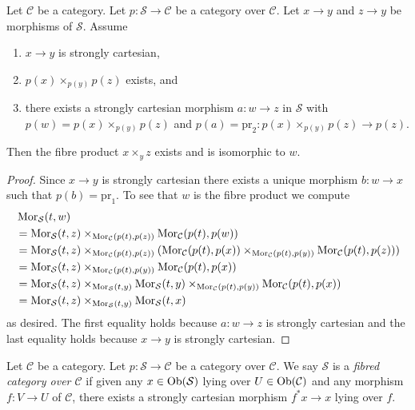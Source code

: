 \begin{lemma}
\label{lemma-strongly-cartesian-fibre-product}
Let $\mathcal{C}$ be a category.
Let $p : \mathcal{S} \to \mathcal{C}$ be a category over $\mathcal{C}$.
Let $x \to y$ and $z \to y$ be morphisms of $\mathcal{S}$.
Assume
\begin{enumerate}
\item $x \to y$ is strongly cartesian,
\item $p(x) \times_{p(y)} p(z)$ exists, and
\item there exists a strongly cartesian morphism $a : w \to z$ in
$\mathcal{S}$ with $p(w) = p(x) \times_{p(y)} p(z)$ and
$p(a) = \text{pr}_2 : p(x) \times_{p(y)} p(z) \to p(z)$.
\end{enumerate}
Then the fibre product $x \times_y z$ exists and is isomorphic to $w$.
\end{lemma}

\begin{proof}
Since $x \to y$ is strongly cartesian there exists a unique morphism
$b : w \to x$ such that $p(b) = \text{pr}_1$. To see that $w$ is the
fibre product we compute
\begin{align*}
& \mathop{\mathrm{Mor}}\nolimits_\mathcal{S}(t, w) \\
& = \mathop{\mathrm{Mor}}\nolimits_\mathcal{S}(t, z)
\times_{\mathop{\mathrm{Mor}}\nolimits_\mathcal{C}(p(t), p(z))}
\mathop{\mathrm{Mor}}\nolimits_\mathcal{C}(p(t), p(w)) \\
& = \mathop{\mathrm{Mor}}\nolimits_\mathcal{S}(t, z)
\times_{\mathop{\mathrm{Mor}}\nolimits_\mathcal{C}(p(t), p(z))}
(\mathop{\mathrm{Mor}}\nolimits_\mathcal{C}(p(t), p(x))
\times_{\mathop{\mathrm{Mor}}\nolimits_\mathcal{C}(p(t), p(y))}
\mathop{\mathrm{Mor}}\nolimits_\mathcal{C}(p(t), p(z))) \\
& = \mathop{\mathrm{Mor}}\nolimits_\mathcal{S}(t, z)
\times_{\mathop{\mathrm{Mor}}\nolimits_\mathcal{C}(p(t), p(y))}
\mathop{\mathrm{Mor}}\nolimits_\mathcal{C}(p(t), p(x)) \\
& = \mathop{\mathrm{Mor}}\nolimits_\mathcal{S}(t, z)
\times_{\mathop{\mathrm{Mor}}\nolimits_\mathcal{S}(t, y)}
\mathop{\mathrm{Mor}}\nolimits_\mathcal{S}(t, y)
\times_{\mathop{\mathrm{Mor}}\nolimits_\mathcal{C}(p(t), p(y))}
\mathop{\mathrm{Mor}}\nolimits_\mathcal{C}(p(t), p(x)) \\
& = \mathop{\mathrm{Mor}}\nolimits_\mathcal{S}(t, z)
\times_{\mathop{\mathrm{Mor}}\nolimits_\mathcal{S}(t, y)}
\mathop{\mathrm{Mor}}\nolimits_\mathcal{S}(t, x)
\end{align*}
as desired. The first equality holds because $a : w \to z$ is strongly
cartesian and the last equality holds because $x \to y$ is strongly
cartesian.
\end{proof}

\begin{definition}
\label{definition-fibred-category}
Let $\mathcal{C}$ be a category.
Let $p : \mathcal{S} \to \mathcal{C}$ be a category over $\mathcal{C}$.
We say $\mathcal{S}$ is a {\it fibred category over $\mathcal{C}$}
if given any $x \in \mathop{\mathrm{Ob}}\nolimits(\mathcal{S})$ lying over
$U \in \mathop{\mathrm{Ob}}\nolimits(\mathcal{C})$ and any morphism $f : V \to U$ of
$\mathcal{C}$, there exists a strongly cartesian morphism $f^*x \to x$
lying over $f$.
\end{definition}

